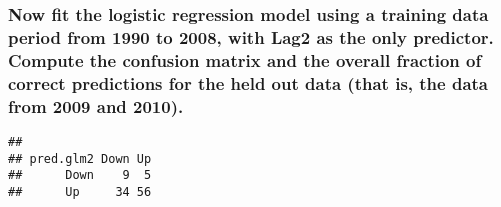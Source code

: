 \documentclass[]{article}
\newenvironment{Shaded}{\begin{snugshade}}{\end{snugshade}}
\newcommand{\KeywordTok}[1]{\textcolor[rgb]{0.13,0.29,0.53}{\textbf{#1}}}
\newcommand{\DataTypeTok}[1]{\textcolor[rgb]{0.13,0.29,0.53}{#1}}
\newcommand{\DecValTok}[1]{\textcolor[rgb]{0.00,0.00,0.81}{#1}}
\newcommand{\FloatTok}[1]{\textcolor[rgb]{0.00,0.00,0.81}{#1}}
\newcommand{\StringTok}[1]{\textcolor[rgb]{0.31,0.60,0.02}{#1}}
\newcommand{\OperatorTok}[1]{\textcolor[rgb]{0.81,0.36,0.00}{\textbf{#1}}}
\newcommand{\NormalTok}[1]{#1}
\begin{document}
\subsubsection{Now fit the logistic regression model using a training
data period from 1990 to 2008, with Lag2 as the only predictor. Compute
the confusion matrix and the overall fraction of correct predictions for
the held out data (that is, the data from 2009 and
2010).}\label{now-fit-the-logistic-regression-model-using-a-training-data-period-from-1990-to-2008-with-lag2-as-the-only-predictor.-compute-the-confusion-matrix-and-the-overall-fraction-of-correct-predictions-for-the-held-out-data-that-is-the-data-from-2009-and-2010.}

\begin{Shaded}
\end{Shaded}

\begin{verbatim}
##          
## pred.glm2 Down Up
##      Down    9  5
##      Up     34 56
\end{verbatim}
\end{document}
